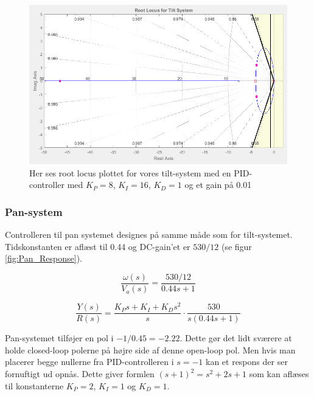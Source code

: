 \begin{figure}[ht]
	\begin{center}
		\includegraphics[scale=0.45]{Billeder/Tilt_Rlocus.PNG}
	\end{center}
\caption{Her ses root locus plottet for vores tilt-system med en PID-controller med $K_{P}=8$, $K_{I}=16$, $K_{D}=1$ og et gain på 0.01}
\label{fig:Tilt_rlocus}
\end{figure}

\subsubsection{Pan-system}

Controlleren til pan systemet designes på samme måde som for tilt-systemet. Tidskonstanten er aflæst til 0.44 og DC-gain'et er $530/12$ (se figur \ref{fig:Pan_Response}). 

\begin{equation}\label{eq:pan_tf}
\frac{\omega(s)}{V_{a}(s)}=\frac{530/12}{0.44s+1}
\end{equation}

\begin{equation}\label{eq:pan_ol_tf}
\frac{Y(s)}{R(s)}=\frac{K_{P}s+K_{I}+K_{D}s^2}{s}\cdot\frac{530}{s(0.44s+1)}
\end{equation}

Pan-systemet tilføjer en pol i $-1/0.45=-2.22$. Dette gør det lidt sværere at holde closed-loop polerne på højre side af denne open-loop pol. Men hvis man placerer begge nullerne fra PID-controlleren i $s=-1$ kan et respons der ser fornuftigt ud opnås. Dette giver formlen $(s+1)^2=s^2+2s+1$ som kan aflæses til konstanterne $K_{P}=2$, $K_{I}=1$ og $K_{D}=1$. 

